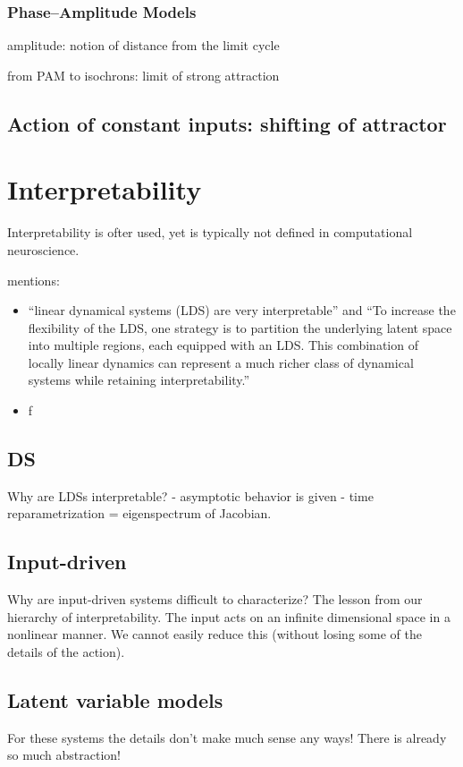 \documentclass{article}
\theoremstyle{definition} \newtheorem{definition}{Definition}  \newtheorem{example}{Example}
\theoremstyle{remark} \newtheorem{remark}{Remark}
\newcounter{ct}
\begin{document}
\subsubsection{Phase–Amplitude Models}
amplitude: notion of distance from the limit cycle \citep{hale2009ordinary} \citep{ermentrout1991multiple}


from PAM to isochrons: limit of strong attraction\citep{ermentrout1990oscillator}


\subsection{Action of constant inputs: shifting of attractor}



\newpage
\section{Interpretability}
Interpretability is ofter used, yet is typically not defined in computational neuroscience\citep{Zhao2016d, duncker2019learning}.

mentions:
\begin{itemize}
\item ``linear dynamical systems (LDS) are very interpretable'' and  ``To increase the flexibility of the LDS, one strategy is to partition the underlying latent space into multiple regions, each equipped with an LDS. This combination of locally linear dynamics can represent a much richer class of dynamical systems while retaining interpretability.'' \citep{Nassar2018b}
\item f
\end{itemize}

\subsection{DS}
Why are LDSs interpretable?
- asymptotic behavior is given
- time reparametrization = eigenspectrum of Jacobian.


\subsection{Input-driven}
Why are input-driven systems difficult to characterize? The lesson from our hierarchy of interpretability.
The input acts on an infinite dimensional space in a nonlinear manner.
We cannot easily reduce this (without losing some of the details of the action).


\subsection{Latent variable models}
For these systems the details don't make much sense any ways!
There is already so much abstraction!
\end{document}
